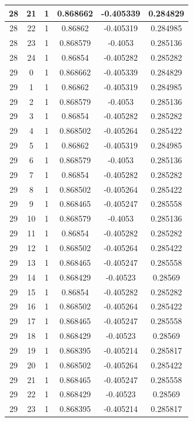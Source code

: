 \documentclass[12pt,a4paper]{article}
\numberwithin{equation}{section}
\numberwithin{figure}{section}
\numberwithin{table}{section}
\begin{document}
\begin{longtable}{|c|c|c|c|c|c|}
28 & 21 & 1 & 0.868662 & -0.405339 & 0.284829 \\ \hline
28 & 22 & 1 & 0.86862 & -0.405319 & 0.284985 \\ \hline
28 & 23 & 1 & 0.868579 & -0.4053 & 0.285136 \\ \hline
28 & 24 & 1 & 0.86854 & -0.405282 & 0.285282 \\ \hline
29 & 0 & 1 & 0.868662 & -0.405339 & 0.284829 \\ \hline
29 & 1 & 1 & 0.86862 & -0.405319 & 0.284985 \\ \hline
29 & 2 & 1 & 0.868579 & -0.4053 & 0.285136 \\ \hline
29 & 3 & 1 & 0.86854 & -0.405282 & 0.285282 \\ \hline
29 & 4 & 1 & 0.868502 & -0.405264 & 0.285422 \\ \hline
29 & 5 & 1 & 0.86862 & -0.405319 & 0.284985 \\ \hline
29 & 6 & 1 & 0.868579 & -0.4053 & 0.285136 \\ \hline
29 & 7 & 1 & 0.86854 & -0.405282 & 0.285282 \\ \hline
29 & 8 & 1 & 0.868502 & -0.405264 & 0.285422 \\ \hline
29 & 9 & 1 & 0.868465 & -0.405247 & 0.285558 \\ \hline
29 & 10 & 1 & 0.868579 & -0.4053 & 0.285136 \\ \hline
29 & 11 & 1 & 0.86854 & -0.405282 & 0.285282 \\ \hline
29 & 12 & 1 & 0.868502 & -0.405264 & 0.285422 \\ \hline
29 & 13 & 1 & 0.868465 & -0.405247 & 0.285558 \\ \hline
29 & 14 & 1 & 0.868429 & -0.40523 & 0.28569 \\ \hline
29 & 15 & 1 & 0.86854 & -0.405282 & 0.285282 \\ \hline
29 & 16 & 1 & 0.868502 & -0.405264 & 0.285422 \\ \hline
29 & 17 & 1 & 0.868465 & -0.405247 & 0.285558 \\ \hline
29 & 18 & 1 & 0.868429 & -0.40523 & 0.28569 \\ \hline
29 & 19 & 1 & 0.868395 & -0.405214 & 0.285817 \\ \hline
29 & 20 & 1 & 0.868502 & -0.405264 & 0.285422 \\ \hline
29 & 21 & 1 & 0.868465 & -0.405247 & 0.285558 \\ \hline
29 & 22 & 1 & 0.868429 & -0.40523 & 0.28569 \\ \hline
29 & 23 & 1 & 0.868395 & -0.405214 & 0.285817 \\ \hline

\end{longtable}
\end{document}
